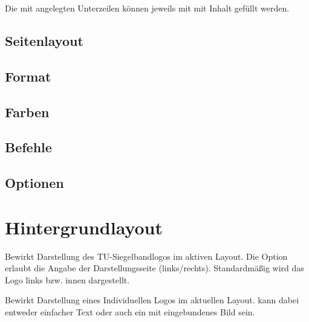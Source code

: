 \documentclass[a4paper,11pt]{tubsreprt}
\begin{document}
Die mit  angelegten Unterzeilen können jeweils mit 
 mit Inhalt gefüllt werden.

\begin{Example}

\end{Example}

\section{Seitenlayout}



\section{Format}

\section{Farben}

\section{Befehle}

\section{Optionen}





\chapter{Hintergrundlayout}

\begin{Declaration}
\end{Declaration}

Bewirkt Darstellung des TU-Siegelbandlogos im aktiven Layout.
Die Option  erlaubt die Angabe der Darstellungsseite
(links/rechts). Standardmäßig wird das Logo links bzw. innen dargestellt.

\begin{Declaration}
\end{Declaration}

Bewirkt Darstellung eines Individuellen Logos im aktuellen Layout.
 kann dabei entweder einfacher Text oder auch ein 
mit  eingebundenes Bild sein.
\end{document}

